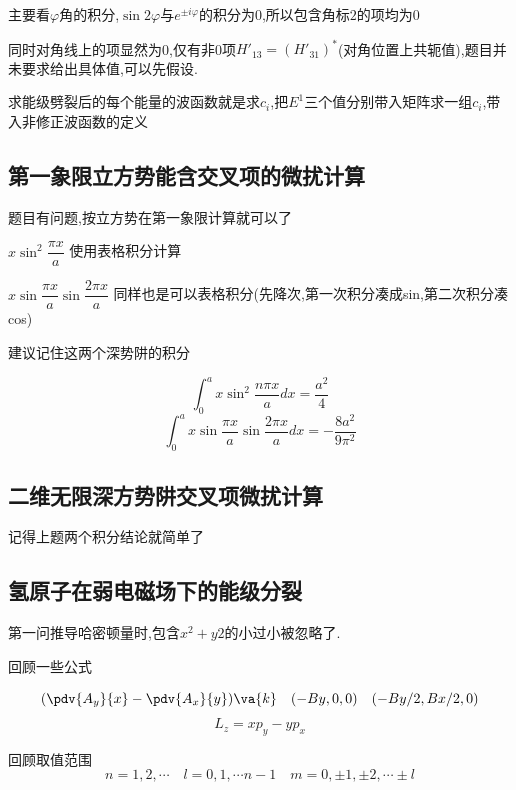             主要看$\varphi$角的积分,$\sin{2\varphi}$与$e^{\pm i \varphi}$的积分为$0$,所以包含角标$2$的项均为0

            同时对角线上的项显然为0,仅有非0项$H'_{13} = (H'_{31})^{*} $(对角位置上共轭值),题目并未要求给出具体值,可以先假设.

            求能级劈裂后的每个能量的波函数就是求$c_{i}$,把$E^{1}$三个值分别带入矩阵求一组$c_{i}$,带入非修正波函数的定义


        \subsection{第一象限立方势能含交叉项的微扰计算}
            题目有问题,按立方势在第一象限计算就可以了

            $ x \sin^{2}{\dfrac{\pi x }{a}} $ 使用表格积分计算

            $ x \sin{\dfrac{\pi x }{a}} \sin{\dfrac{2 \pi x }{a}} $ 同样也是可以表格积分(先降次,第一次积分凑成sin,第二次积分凑cos)

            \begin{formal}
                建议记住这两个深势阱的积分

                $$ \int_{0}^{a} x \sin^{2}{\dfrac{n \pi x }{a}} dx = \frac{a^{2}}{4} $$
                $$ \int_{0}^{a} x \sin{\dfrac{\pi x }{a}} \sin{\dfrac{2 \pi x }{a}} dx = - \frac{8a^{2}}{9\pi^{2}} $$
            \end{formal}



        \subsection{二维无限深方势阱交叉项微扰计算}
            记得上题两个积分结论就简单了


        
        \subsection{氢原子在弱电磁场下的能级分裂}
            第一问推导哈密顿量时,包含$x^{2} + y{2}$的小过小被忽略了.
            
            回顾一些公式

            $$ (\pdv{A_{y}}{x} - \pdv{A_{x}}{y})\va{k} \quad (-By,0,0) \quad (-By/2,Bx/2,0)$$
            $$ L_{z} = xp_{y} - yp_{x} $$

            回顾取值范围
            $$ n = 1,2,\cdots \quad l = 0,1,\cdots n-1 \quad m = 0,\pm 1,\pm 2,\cdots \pm l $$

